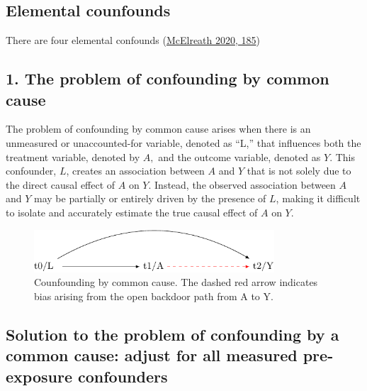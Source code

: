 \documentclass[
  singlecolumn]{report}
\begin{document}
\hypertarget{elemental-counfounds}{%
\subsection{Elemental counfounds}\label{elemental-counfounds}}

There are four elemental confounds
(\protect\hyperlink{ref-mcelreath2020}{McElreath 2020, 185})

\hypertarget{the-problem-of-confounding-by-common-cause}{%
\subsection{1. The problem of confounding by common
cause}\label{the-problem-of-confounding-by-common-cause}}

The problem of confounding by common cause arises when there is an
unmeasured or unaccounted-for variable, denoted as ``L,'' that
influences both the treatment variable, denoted by \(A,\) and the
outcome variable, denoted as \(Y.\) This confounder, \(L\), creates an
association between \(A\) and \(Y\) that is not solely due to the direct
causal effect of \(A\) on \(Y\). Instead, the observed association
between \(A\) and \(Y\) may be partially or entirely driven by the
presence of \(L\), making it difficult to isolate and accurately
estimate the true causal effect of \(A\) on \(Y\).

\begin{figure}

{\centering \includegraphics[width=0.8\textwidth,height=\textheight]{causal-dags_files/figure-pdf/fig-dag-common-cause-1.pdf}

}

\caption{\label{fig-dag-common-cause}Counfounding by common cause. The
dashed red arrow indicates bias arising from the open backdoor path from
A to Y.}

\end{figure}

\hypertarget{solution-to-the-problem-of-confounding-by-a-common-cause-adjust-for-all-measured-pre-exposure-confounders}{%
\subsection{Solution to the problem of confounding by a common cause:
adjust for all measured pre-exposure
confounders}\label{solution-to-the-problem-of-confounding-by-a-common-cause-adjust-for-all-measured-pre-exposure-confounders}}
\end{document}
